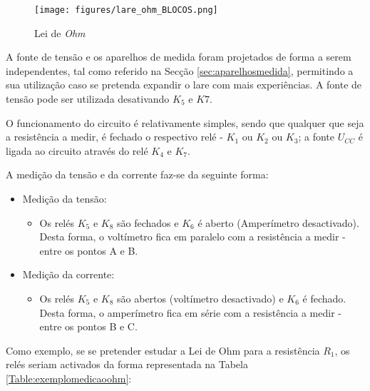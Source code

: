 \begin{figure}[hbtp]
	\centering
	\texttt{[image: figures/lare\_ohm\_BLOCOS.png]}
	\caption{ Lei de \textit{Ohm}}
	\label{fig:Implementacaoleideohm}
\end{figure}

A fonte de tensão e os aparelhos de medida foram projetados de forma a serem independentes, tal como referido na Secção \ref{sec:aparelhosmedida}, permitindo a sua utilização caso se pretenda expandir o \acrshort{lare} com mais experiências. A fonte de tensão pode ser utilizada desativando $K_{5}$ e $K7$.

O funcionamento do circuito é relativamente simples, sendo que qualquer que seja a resistência a medir, é fechado o respectivo relé - $K_{1}$ ou $K_{2}$ ou $K_{3}$; a fonte $U_{CC}$ é ligada ao circuito através do relé $K_{4}$ e $K_{7}$.

A medição da tensão e da corrente faz-se da seguinte forma:
\begin{itemize}
	\item Medição da tensão:
	      \begin{itemize}
		      \item Os relés $K_{5}$ e $K_{8}$ são fechados e $K_{6}$ é aberto (Amperímetro desactivado). Desta forma, o voltímetro fica em paralelo com a resistência a medir - entre os pontos A e B.
	      \end{itemize}
	\item Medição da corrente:
	      \begin{itemize}
		      \item Os relés $K_{5}$ e $K_{8}$ são abertos (voltímetro desactivado) e $K_{6}$ é fechado. Desta forma, o amperímetro fica em série com a resistência a medir - entre os pontos B e C.
	      \end{itemize}
\end{itemize}


Como exemplo, se se pretender estudar a Lei de Ohm para a resistência $R_{1}$, os relés seriam activados da forma representada na Tabela \ref{Table:exemplomedicaoohm}:

